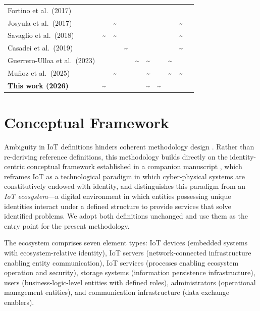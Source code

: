 \documentclass[preprint,12pt,authoryear]{elsarticle}
\newcommand{\cmark}{\ding{51}}
\newcommand{\xmark}{\ding{55}}
\newcommand{\yes}{\textcolor{checkgreen}{\cmark}}
\newcommand{\no}{\textcolor{crossred}{\xmark}}
\newcommand{\pyes}{\textcolor{partialyellow}{\textasciitilde}}
\begin{document}
\begin{table}[hbtp]
{\begin{tabular}{lccccccccc}
        Fortino et al.\ (2017) \citep{fortino2017agent}         & \yes  & \no   & \no   & \no   & \yes  & \yes  & \yes  & \no   & \no \\
        Josyula et al.\ (2017) \citep{josyula2017new}           & \no   & \pyes & \yes  & \no   & \yes  & \no   & \yes  & \pyes & \no \\
        Savaglio et al.\ (2018) \citep{savaglio2018methodology}  & \pyes & \pyes & \yes  & \no   & \yes  & \no   & \yes  & \pyes & \no \\
        Casadei et al.\ (2019) \citep{casadei2019engineering}   & \yes  & \no   & \pyes & \no   & \yes  & \no   & \yes  & \pyes & \no \\
        Guerrero-Ulloa et al.\ (2023) \citep{guerrero2023agile} & \yes  & \no   & \yes  & \pyes & \pyes & \no   & \pyes & \no   & \no \\
        Mu\~{n}oz et al.\ (2025) \citep{munoz2025internet}      & \yes  & \pyes & \no   & \no   & \pyes & \no   & \pyes & \pyes & \no \\
        \textbf{This work (2026)}                                & \pyes & \yes  & \yes  & \yes  & \pyes & \pyes & \yes  & \yes  & \yes \\
        \bottomrule
    \end{tabular}}
\end{table}


\section{Conceptual Framework}
\label{sec:conceptual}

Ambiguity in IoT definitions hinders coherent methodology design \citep{sorri2022revisiting}. Rather than re-deriving reference definitions, this methodology builds directly on the identity-centric conceptual framework established in a companion manuscript \citep{campos2026identity}, which reframes IoT as a technological paradigm in which cyber-physical systems are constitutively endowed with identity, and distinguishes this paradigm from an \emph{IoT ecosystem}---a digital environment in which entities possessing unique identities interact under a defined structure to provide services that solve identified problems. We adopt both definitions unchanged and use them as the entry point for the present methodology.

The ecosystem comprises seven element types: IoT devices (embedded systems with ecosystem-relative identity), IoT servers (network-connected infrastructure enabling entity communication), IoT services (processes enabling ecosystem operation and security), storage systems (information persistence infrastructure), users (business-logic-level entities with defined roles), administrators (operational management entities), and communication infrastructure (data exchange enablers).
\end{document}
